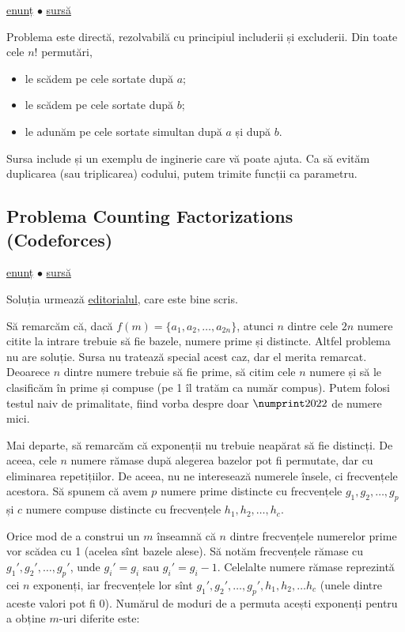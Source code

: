 \documentclass[../main.tex]{subfiles}
\begin{document}
\href{https://codeforces.com/contest/1207/problem/D}{enunț}
$\bullet$
\hyperref[code:number-of-permutations]{sursă}

Problema este directă, rezolvabilă cu principiul includerii și excluderii. Din toate cele $n!$ permutări,

\begin{itemize}
  \item le scădem pe cele sortate după $a$;
  \item le scădem pe cele sortate după $b$;
  \item le adunăm pe cele sortate simultan după $a$ și după $b$.
\end{itemize}

Sursa include și un exemplu de inginerie care vă poate ajuta. Ca să evităm duplicarea (sau triplicarea) codului, putem trimite funcții ca parametru.

\subsection{Problema Counting Factorizations (Codeforces)}
\label{problem:counting-factorizations}

\href{https://codeforces.com/contest/1794/problem/D}{enunț}
$\bullet$
\hyperref[code:counting-factorizations]{sursă}

Soluția urmează \href{https://codeforces.com/blog/entry/113500}{editorialul}, care este bine scris.

Să remarcăm că, dacă $f(m) = \{a_1, a_2, \dots, a_{2n}\}$, atunci $n$ dintre cele $2n$ numere citite la intrare trebuie să fie bazele, numere prime și distincte. Altfel problema nu are soluție. Sursa nu tratează special acest caz, dar el merita remarcat. Deoarece $n$ dintre numere trebuie să fie prime, să citim cele $n$ numere și să le clasificăm în prime și compuse (pe 1 îl tratăm ca număr compus). Putem folosi testul naiv de primalitate, fiind vorba despre doar $\np{2022}$ de numere mici.

Mai departe, să remarcăm că exponenții nu trebuie neapărat să fie distincți. De aceea, cele $n$ numere rămase după alegerea bazelor pot fi permutate, dar cu eliminarea repetițiilor. De aceea, nu ne interesează numerele însele, ci frecvențele acestora. Să spunem că avem $p$ numere prime distincte cu frecvențele $g_1, g_2,\dots, g_p$ și $c$ numere compuse distincte cu frecvențele $h_1, h_2, \dots, h_c$.

Orice mod de a construi un $m$ înseamnă că $n$ dintre frecvențele numerelor prime vor scădea cu 1 (acelea sînt bazele alese). Să notăm frecvențele rămase cu $g_1', g_2', \dots, g_p'$, unde $g_i' = g_i$ sau $g_i' = g_i - 1$. Celelalte numere rămase reprezintă cei $n$ exponenți, iar frecvențele lor sînt $g_1', g_2', \dots, g_p', h_1, h_2, \dots h_c$ (unele dintre aceste valori pot fi 0). Numărul de moduri de a permuta acești exponenți pentru a obține $m$-uri diferite este:
\end{document}
